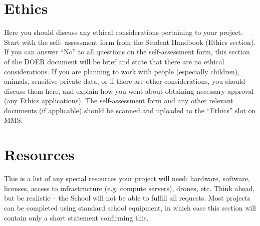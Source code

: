 \documentclass[12pt]{extarticle}
\begin{document}
\section*{Ethics}

Here you should discuss any ethical considerations
pertaining to your project. Start with the self-
assessment form from the Student Handbook (Ethics
section). If you can answer “No” to all questions on the
self-assessment form, this section of the DOER
document will be brief and state that there are no ethical
considerations.
If you are planning to work with people (especially
children), animals, sensitive private data, or if there are
other considerations, you should discuss them here, and
explain how you went about obtaining necessary
approval (any Ethics applications).
The self-assessment form and any other relevant
documents (if applicable) should be scanned and
uploaded to the “Ethics” slot on MMS.

\section*{Resources}

This is a list of any special resources your project will
need: hardware, software, licenses, access to
infrastructure (e.g. compute servers), drones, etc. Think
ahead, but be realistic -- the School will not be able to
fulfill all requests.
Most projects can be completed using standard school
equipment, in which case this section will contain only a
short statement confirming this.
\end{document}
